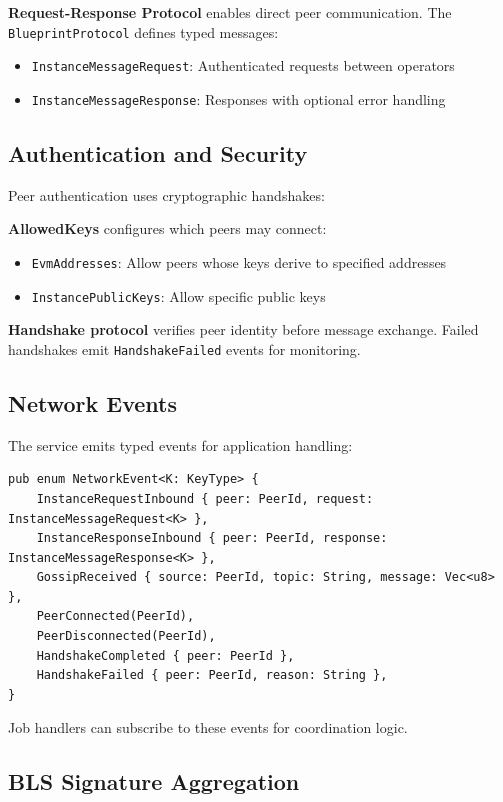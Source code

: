 \documentclass[11pt,a4paper]{article}
\begin{document}
\textbf{Request-Response Protocol} enables direct peer communication. The \texttt{BlueprintProtocol} defines typed messages:
\begin{itemize}[noitemsep]
    \item \texttt{InstanceMessageRequest}: Authenticated requests between operators
    \item \texttt{InstanceMessageResponse}: Responses with optional error handling
\end{itemize}

\subsection{Authentication and Security}

Peer authentication uses cryptographic handshakes:

\textbf{AllowedKeys} configures which peers may connect:
\begin{itemize}[noitemsep]
    \item \texttt{EvmAddresses}: Allow peers whose keys derive to specified addresses
    \item \texttt{InstancePublicKeys}: Allow specific public keys
\end{itemize}

\textbf{Handshake protocol} verifies peer identity before message exchange. Failed handshakes emit \texttt{HandshakeFailed} events for monitoring.

\subsection{Network Events}

The service emits typed events for application handling:

\begin{lstlisting}
pub enum NetworkEvent<K: KeyType> {
    InstanceRequestInbound { peer: PeerId, request: InstanceMessageRequest<K> },
    InstanceResponseInbound { peer: PeerId, response: InstanceMessageResponse<K> },
    GossipReceived { source: PeerId, topic: String, message: Vec<u8> },
    PeerConnected(PeerId),
    PeerDisconnected(PeerId),
    HandshakeCompleted { peer: PeerId },
    HandshakeFailed { peer: PeerId, reason: String },
}
\end{lstlisting}

Job handlers can subscribe to these events for coordination logic.

\subsection{BLS Signature Aggregation}
\end{document}
